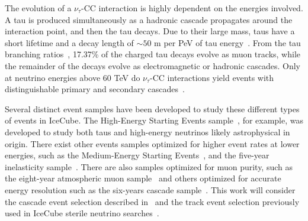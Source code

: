 \documentclass[main.tex]{subfiles}
\begin{document}
The evolution of a $\nu_{\tau}$-CC interaction is highly dependent on the energies involved. A tau is produced simultaneously as a hadronic cascade propagates around the interaction point, and then the tau decays. 
Due to their large mass, taus have a short lifetime and a decay length of $\sim 50$ m per PeV of tau energy~\cite{abbasi2020measurement}. 
From the tau branching ratios~\cite{PhysRevD.98.030001}, 17.37\% of the charged tau decays evolve as muon tracks, while the remainder of the decays evolve as electromagnetic or hadronic cascades. Only at neutrino energies above 60 TeV do $\nu_{\tau}$-CC interactions yield events with distinguishable primary and secondary cascades~\cite{abbasi2020measurement}.

Several distinct event samples have been developed to study these different types of events in IceCube. The High-Energy Starting Events sample~\cite{2021hese}, for example, was developed to study both taus and high-energy neutrinos likely astrophysical in origin. There exist other events samples optimized for higher event rates at lower energies, such as the Medium-Energy Starting Events~\cite{PhysRevDoverone}, and the five-year inelasticity sample~\cite{inelasticity2019}. There are also samples optimized for muon purity, such as the eight-year atmospheric muon sample~\cite{Aartsen_2020_prd} and others optimized for accurate energy resolution such as the six-years cascade sample~\cite{sixyrscascade}. This work will consider the cascade event selection described in~\cite{2018PhDT17N} and the track event selection previously used in IceCube sterile neutrino searches~\cite{PhysRevLett.117.071801}.
\end{document}
